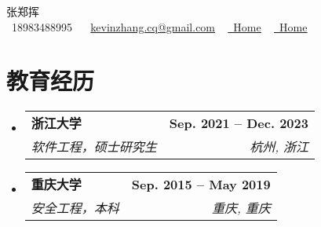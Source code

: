 \documentclass[letterpaper,11pt]{ctexart}
\makeatletter
\newcommand{\resumeSubheading}[4]{
  \vspace{-2pt}\item
    \begin{tabular*}{1.0\textwidth}[t]{l@{\extracolsep{\fill}}r}
      \textbf{#1} & \textbf{\small #2} \\
      \textit{\small#3} & \textit{\small #4} \\
    \end{tabular*}\vspace{-7pt}
}
\newcommand{\resumeSubHeadingListStart}{\begin{itemize}[leftmargin=0.0in, label={}]}
\newcommand{\resumeSubHeadingListEnd}{\end{itemize}}
\makeatother
\begin{document}

\begin{center}
    {\Huge \scshape 张郑挥} \\ \vspace{1pt}
    \vspace{1pt}
    \small \raisebox{-0.1\height}\faPhone\ 18983488995 ~ \raisebox{-0.2\height}\faEnvelope\  \underline{kevinzhang.cq@gmail.com} ~
    \href{https://linkedin.com/in/kevin-zhang-95245521b/}{\raisebox{-0.2\height}\faLinkedin\ \underline{Home}}  ~
    \href{https://github.com/kevin-zhangzh}{\raisebox{-0.2\height}\faGithub\ \underline{Home}}
    \vspace{-8pt}
\end{center}


\section{教育经历}
  \resumeSubHeadingListStart
    \resumeSubheading
      {浙江大学}{Sep. 2021 -- Dec. 2023}
      {软件工程，硕士研究生}{杭州, 浙江}
    \resumeSubheading
      {重庆大学}{Sep. 2015 -- May 2019}
      {安全工程，本科}{重庆, 重庆}
  \resumeSubHeadingListEnd

\end{document}
